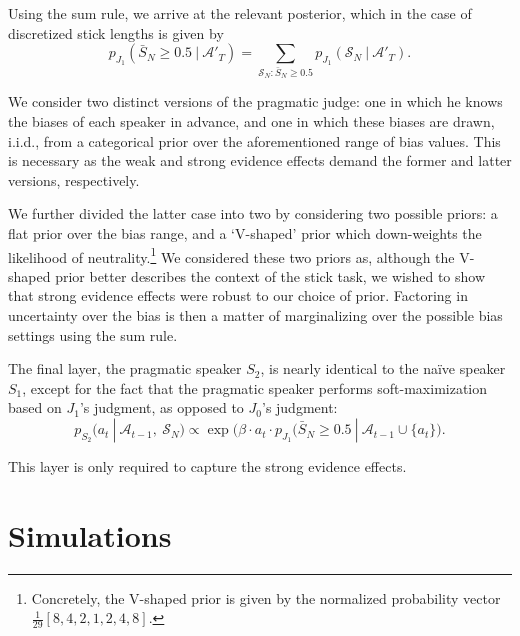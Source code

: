 \documentclass[10pt,letterpaper]{article}
\begin{document}
Using the sum rule, we arrive at the relevant posterior, which in the case of discretized stick lengths is given by
\begin{equation}
	p_{J_1} ( \bar{S}_N \ge 0.5 \ | \ \mathcal{A}'_T ) = \sum_{\mathcal{S}_N \colon \bar{S}_N \ge 0.5} p_{J_1} (\mathcal{S}_N \ | \ \mathcal{A}'_T).
\end{equation}

We consider two distinct versions of the pragmatic judge: one in which he knows the biases of each speaker in advance, and
one in which these biases are drawn, i.i.d., from a categorical prior over the aforementioned range of bias values. This is 
necessary as the weak and strong evidence effects demand the former and latter versions, respectively. 

We further divided the latter case into two by considering two possible priors: a flat prior over the bias range, and a `V-shaped' prior which down-weights 
the likelihood of neutrality.\footnote{Concretely, the V-shaped prior is given by the normalized probability vector $\frac{1}{29} [8, 4, 2, 1, 2, 4, 8]$.} 
We considered these two priors as, although the V-shaped prior better describes the context of the stick task, we wished to show 
that strong evidence effects were robust to our choice of prior. Factoring in uncertainty over the bias is then a matter of 
marginalizing over the possible bias settings using the sum rule.

The final layer, the pragmatic speaker $S_2$, is nearly identical to the na\"ive speaker $S_1$, except for the fact that
the pragmatic speaker performs soft-maximization based on $J_1$'s judgment, as opposed to $J_0$'s judgment:
\begin{equation}
	p_{S_2} (a_t \ | \ \mathcal{A}_{t-1},\ \mathcal{S}_N) \propto \exp \bigl(\beta \cdot a_t \cdot p_{J_1} (\bar{S}_N \ge 0.5 \ | \ \mathcal{A}_{t-1} \cup \{a_t\} \bigr).
\end{equation}

This layer is only required to capture the strong evidence effects.

\section{Simulations}
\end{document}
